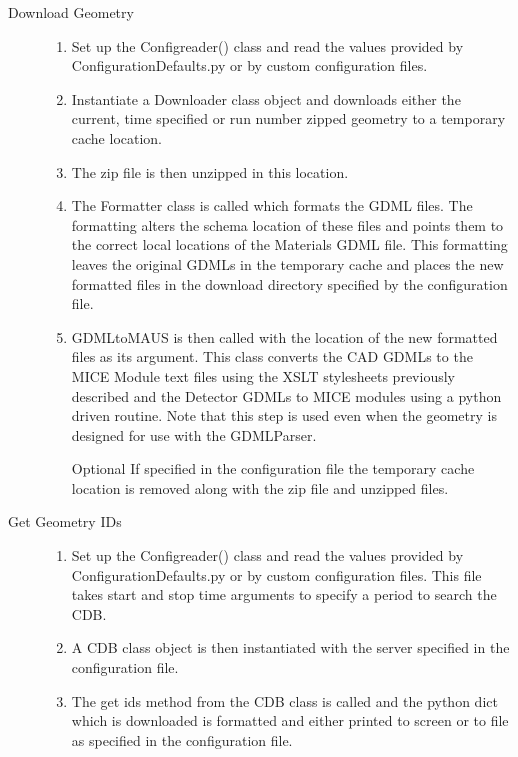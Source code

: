 \begin{description}
  \item[Download Geometry] \hfill
  \begin{enumerate}
   \item Set up the Configreader() class and read the values provided
   by ConfigurationDefaults.py or by custom configuration files.
   \item Instantiate a Downloader class object and downloads either
the current, time specified or run number zipped geometry to a
temporary cache location.
   \item The zip file is then unzipped in this location.
   \item The Formatter class is called which formats the GDML
files. The formatting alters the schema location of these files and
points them to the correct local locations of the Materials GDML
file. This formatting leaves the original GDMLs in the temporary cache
and places the new formatted files in the download directory specified
by the configuration file.
   \item GDMLtoMAUS is then called with the location of the new
formatted files as its argument. This class converts the CAD GDMLs to
the MICE Module text files using the XSLT stylesheets previously
described and the Detector GDMLs to MICE modules using a python driven
routine. Note that this step is used even when the geometry is
designed for use with the GDMLParser.
   \item[Optional] If specified in the configuration file the
   temporary cache location is removed along with the zip file and
   unzipped files.
  \end{enumerate}

  \item[Get Geometry IDs]
  \begin{enumerate}
   \item Set up the Configreader() class and read the values provided
by ConfigurationDefaults.py or by custom configuration files. This
file takes start and stop time arguments to specify a period to search
the CDB.
   \item A CDB class object is then instantiated with the server
   specified in the configuration file.
   \item The get ids method from the CDB class is called and the
python dict which is downloaded is formatted and either printed to
screen or to file as specified in the configuration file.
  \end{enumerate}
\end{description}

